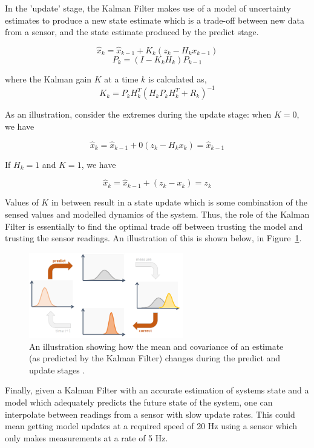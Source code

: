 In the 'update' stage, the Kalman Filter makes use of a model of uncertainty estimates to produce a new state estimate which is a trade-off between new data from a sensor, and the state estimate produced by the predict stage.

\[ \hat{x}_k = \hat{x}_{k-1} + K_k (z_k - H_k x_{k-1}) \]
\[ P_k = (I - K_k H_k) P_{k-1} \]

where the Kalman gain $K$ at a time $k$ is calculated as,
\[ K_k = P_k H_k^T (H_k P_k H_k^T + R_k)^{-1} \]

As an illustration, consider the extremes during the update stage: when $K = 0$, we have

\[ \hat{x}_k = \hat{x}_{k-1} + 0 (z_k - H_k x_k) = \hat{x}_{k-1} \]

If $H_k = 1$ and $K = 1$, we have

\[ \hat{x}_k = \hat{x}_{k-1} + (z_k - x_k) = z_k \]

Values of $K$ in between result in a state update which is some combination of the sensed values and modelled dynamics of the system. Thus, the role of the Kalman Filter is essentially to find the optimal trade off between trusting the model and trusting the sensor readings. An illustration of this is shown below, in Figure~\ref{fig:kalman_filter_loop}.

\begin{figure}[h!]
  \centering
  \includegraphics[width=0.6\textwidth]{literature_review/kalman_filter_loop}
  \caption{\label{fig:kalman_filter_loop}An illustration showing how the mean and covariance of an estimate (as predicted by the Kalman Filter) changes during the predict and update stages \cite{website:kalman_visualisation}.}
\end{figure}


Finally, given a Kalman Filter with an accurate estimation of systems state and a model which adequately predicts the future state of the system, one can interpolate between readings from a sensor with slow update rates. This could mean getting model updates at a required speed of 20 Hz using a sensor which only makes measurements at a rate of 5 Hz.


